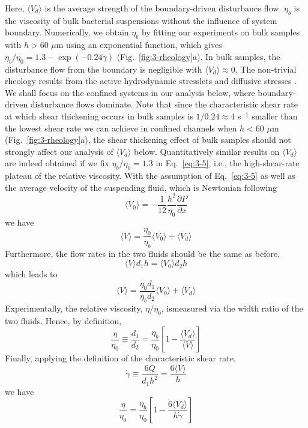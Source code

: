 Here, $\langle V_d \rangle$ is the average strength of the boundary-driven disturbance flow. $\eta_b$ is the viscosity of bulk bacterial suspensions without the influence of system boundary. Numerically, we obtain $\eta_b$ by fitting our experiments on bulk samples with $h > 60$ $\mu$m using an exponential function, which gives $\eta_b/\eta_0=1.3-\exp(-0.24\dot\gamma)$ (Fig.~\ref{fig:3-rheology}a). In bulk samples, the disturbance flow from the boundary is negligible with $\langle V_d \rangle \approx 0$.
The non-trivial rheology results from the active hydrodynamic stresslets and diffusive stresses \cite{Alonso-Matilla2016, Takatori2017}. We shall focus on the confined systems in our analysis below, where boundary-driven disturbance flows dominate. Note that since the characteristic shear rate at which shear thickening occurs in bulk samples is $1/0.24 \approx 4$ s$^{-1}$ smaller than the lowest shear rate we can achieve in confined channels when $h < 60$ $\mu$m (Fig.~\ref{fig:3-rheology}a), the shear thickening effect of bulk samples should not strongly affect our analysis of $\langle V_d \rangle$ below.
Quantitatively similar results on $\langle V_d \rangle$ are indeed obtained if we fix $\eta_b/\eta_0 = 1.3$ in Eq.~\ref{eq:3-5}, i.e.,
the high-shear-rate plateau of the relative viscosity. With the assumption of Eq.~\ref{eq:3-5} as well as the average velocity
of the suspending fluid, which is Newtonian following
\begin{equation}
  \label{eq:3-6}
  \langle V_0 \rangle = -\frac{1}{12}\frac{h^2}{\eta_0}\frac{\partial P}{\partial x}
\end{equation}
we have
\begin{equation}
  \label{eq:3-7}
  \langle V \rangle = \frac{\eta_0}{\eta_b} \langle V_0 \rangle + \langle V_d \rangle
\end{equation}
Furthermore, the flow rates in the two fluids should be the same as before,
$$
  \langle V \rangle d_1 h = \langle V_0 \rangle d_2 h
$$
which leads to
$$
\langle V \rangle = \frac{\eta_0d_1}{\eta_bd_2} \langle V_0 \rangle + \langle V_d \rangle
$$
Experimentally, the relative viscosity, $\eta/\eta_0$, ismeasured via the width ratio of the two fluids. Hence, by definition,
\begin{equation}
  \label{eq:3-8}
  \frac{\eta}{\eta_0} \equiv \frac{d_1}{d_2} = \frac{\eta_b}{\eta_0} \left[ 1 - \frac{\langle V_d \rangle}{\langle V \rangle}  \right]
\end{equation}
Finally, applying the definition of the characteristic shear rate,
$$
\dot\gamma \equiv \frac{6Q}{d_1h^2} = \frac{6\langle V \rangle}{h}
$$
we have
\begin{equation}
  \label{eq:3-9}
  \frac{\eta}{\eta_0} = \frac{\eta_b}{\eta_0} \left[ 1 - \frac{6\langle V_d \rangle}{h\dot\gamma}  \right]
\end{equation}



